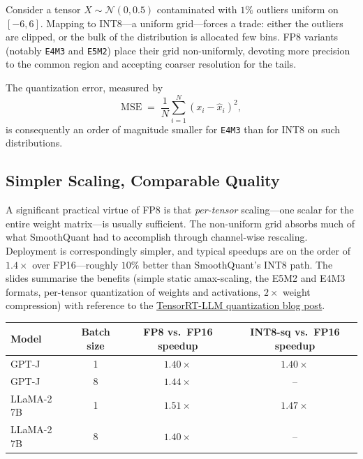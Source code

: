 \documentclass[11pt,a4paper]{article}
\theoremstyle{definition}
\theoremstyle{remark}
\theoremstyle{plain}
\begin{document}
Consider a tensor $X \sim \mathcal{N}(0, 0.5)$ contaminated with $1\%$
outliers uniform on $[-6, 6]$. Mapping to INT8---a uniform grid---forces a
trade: either the outliers are clipped, or the bulk of the distribution is
allocated few bins. FP8 variants (notably \texttt{E4M3} and \texttt{E5M2})
place their grid non-uniformly, devoting more precision to the common
region and accepting coarser resolution for the tails.

The quantization error, measured by
\begin{equation}
  \text{MSE} \;=\; \frac{1}{N}\sum_{i=1}^{N} (x_i - \hat{x}_i)^2,
\end{equation}
is consequently an order of magnitude smaller for \texttt{E4M3} than for
INT8 on such distributions.

\subsection{Simpler Scaling, Comparable Quality}

A significant practical virtue of FP8 is that \emph{per-tensor} scaling---one
scalar for the entire weight matrix---is usually sufficient. The
non-uniform grid absorbs much of what SmoothQuant had to accomplish
through channel-wise rescaling. Deployment is correspondingly simpler, and
typical speedups are on the order of $1.4\times$ over FP16---roughly
$10\%$ better than SmoothQuant's INT8 path. The slides summarise the
benefits (simple static amax-scaling, the E5M2 and E4M3 formats, per-tensor
quantization of weights and activations, $2\times$ weight compression) with
reference to the
\href{https://github.com/NVIDIA/TensorRT-LLM/blob/main/docs/source/blogs/quantization-in-TRT-LLM.md}{TensorRT-LLM
quantization blog post}.

\begin{center}
\renewcommand{\arraystretch}{1.25}
\begin{tabular}{@{}lccc@{}}
\toprule
\textbf{Model} & \textbf{Batch size} & \textbf{FP8 vs.\ FP16 speedup} & \textbf{INT8-sq vs.\ FP16 speedup} \\
\midrule
GPT-J        & 1 & $1.40\times$ & $1.40\times$ \\
GPT-J        & 8 & $1.44\times$ & -- \\
LLaMA-2 7B   & 1 & $1.51\times$ & $1.47\times$ \\
LLaMA-2 7B   & 8 & $1.40\times$ & -- \\
\bottomrule
\end{tabular}
\end{center}
\end{document}
